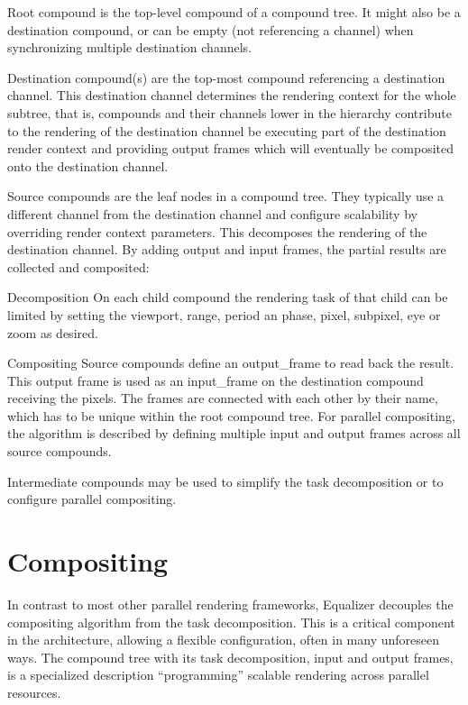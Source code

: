 \begin{compactdesc}
 \item [Root compound] is the top-level compound of a compound tree. It might
 also be a destination compound, or can be empty (not referencing a channel)
 when synchronizing multiple destination channels.
 \item [Destination compound(s)] are the top-most compound referencing a
 destination channel. This destination channel determines the rendering context
 for the whole subtree, that is, compounds and their channels lower in the
 hierarchy contribute to the rendering of the destination channel be executing
 part of the destination render context and providing output frames which will
 eventually be composited onto the destination channel.
 \item [Source compounds] are the leaf nodes in a compound tree. They typically
 use a different channel from the destination channel and configure scalability
 by overriding render context parameters. This decomposes the rendering of the
 destination channel. By adding output and input frames, the partial results are
 collected and composited:
 \begin{compactdesc}
  \item[Decomposition] On each child compound the rendering task of that
  child can be limited by setting the \textsf{viewport}, \textsf{range},
  \textsf{period} an  \textsf{phase}, \textsf{pixel}, \textsf{subpixel},
  \textsf{eye} or \textsf{zoom} as desired.
  \item[Compositing] Source compounds define an \textsf{output\_frame} to read
  back the result. This output frame is used as an \textsf{input\_frame} on the
  destination compound receiving the pixels. The frames are connected with each
  other by their name, which has to be unique within the root compound tree. For
  parallel compositing, the algorithm is described by defining multiple input
  and output frames across all source compounds.
 \end{compactdesc}
 \item[Intermediate compounds] may be used to simplify the task decomposition or
 to configure parallel compositing.
\end{compactdesc}

\section{Compositing}

In contrast to most other parallel rendering frameworks, Equalizer decouples the
compositing algorithm from the task decomposition. This is a critical component
in the architecture, allowing a flexible configuration, often in many unforeseen
ways. The compound tree with its task decomposition, input and output frames, is
a specialized description ``programming'' scalable rendering across parallel
resources.

